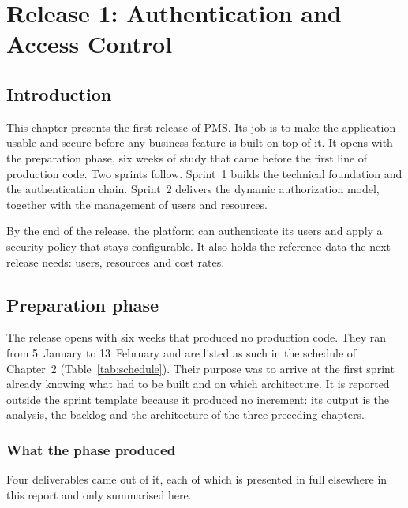 \chapter{Release 1: Authentication and Access Control}

\section*{Introduction}
This chapter presents the first release of PMS. Its job is to make the application usable and
secure before any business feature is built on top of it. It opens with the preparation phase, six
weeks of study that came before the first line of production code. Two sprints follow. Sprint~1
builds the technical foundation and the authentication chain. Sprint~2 delivers the dynamic
authorization model, together with the management of users and resources.

By the end of the release, the platform can authenticate its users and apply a security policy
that stays configurable. It also holds the reference data the next release needs: users, resources
and cost rates.
\section{Preparation phase}
The release opens with six weeks that produced no production code. They ran from 5~January to
13~February and are listed as such in the schedule of Chapter~2
(Table~\ref{tab:schedule}). Their purpose was to arrive at the first sprint already knowing what
had to be built and on which architecture.
It is reported outside the sprint template because it produced no increment: its output is
the analysis, the backlog and the architecture of the three preceding chapters.

\subsection{What the phase produced}
Four deliverables came out of it, each of which is presented in full elsewhere in this report and
only summarised here.

